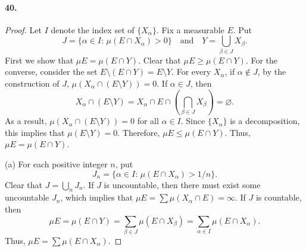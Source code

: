  \paragraph{40.}
  \begin{proof}
    Let $I$ denote the index set of $\{X_\alpha\}$. Fix a measurable $E$. Put
    \[
      J=\{\alpha\in I:\,\mu(E\cap X_\alpha)>0\}
      \quad\text{and}\quad
      Y=\bigcup_{\beta\in J}X_\beta.
    \]
    First we show that $\mu E=\mu(E\cap Y)$. Clear that $\mu E\ge\mu(E\cap Y)$.
    For the converse, consider the set $E\setminus(E\cap Y)=E\setminus Y$. For
    every $X_\alpha$, if $\alpha\notin J$, by the construction of $J$, $\mu(
    X_\alpha\cap(E\setminus Y))=0$. If $\alpha\in J$, then
    \[
      X_\alpha\cap(E\setminus Y)=
      X_\alpha\cap E\cap\left(\bigcap_{\beta\in J}X_\beta\right)=
      \varnothing.
    \]
    As a result, $\mu(X_\alpha\cap(E\setminus Y))=0$ for all $\alpha\in I$. 
    Since $\{X_\alpha\}$ is a decomposition, this implies that $\mu(E\setminus 
    Y)=0$. Therefore, $\mu E\le \mu(E\cap Y)$. Thus, $\mu E=\mu(E\cap Y)$.\par
    (a) For each positive integer $n$, put
    \[
      J_n=\{\alpha\in I:\,\mu(E\cap X_\alpha)>1/n\}.
    \]
    Clear that $J=\bigcup_n J_n$. If $J$ is uncountable, then there must exist
    some uncountable $J_n$, which implies that $\mu E=\sum\mu(X_\alpha\cap E)=
    \infty$. If $J$ is countable, then
    \[
      \mu E=\mu(E\cap Y)=\sum_{\beta\in J}\mu(E\cap X_\beta)=
      \sum_{\alpha\in I}\mu(E\cap X_\alpha).
    \]
    Thus, $\mu E=\sum\mu(E\cap X_\alpha)$.
  \end{proof}












